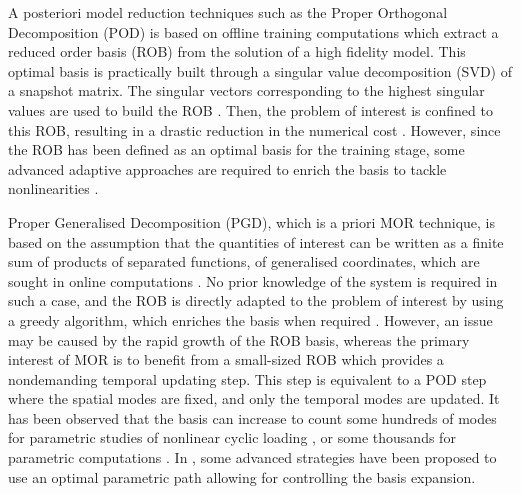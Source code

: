 A posteriori model reduction techniques such as the Proper Orthogonal Decomposition (POD) is based on offline training computations which extract a reduced order basis (ROB) from the solution of a high fidelity model. This optimal basis is practically built through a singular value decomposition (SVD) of a snapshot matrix. The singular vectors corresponding to the highest singular values are used to build the ROB \parencite{cline2006computatio}. Then, the problem of interest is confined to this ROB, resulting in a drastic reduction in the numerical cost \parencite{chinesta2014separated,chinesta_encyclo_2018}. However, since the ROB has been defined as an optimal basis for the training stage, some advanced adaptive approaches are required to enrich the basis to tackle nonlinearities \parencite{kerfriden2011bridging}.

Proper Generalised Decomposition (PGD), which is a priori MOR technique, is based on the assumption that the quantities of interest can be written as a finite sum of products of separated functions, of generalised coordinates, which are sought in online computations \parencite{ladeveze1989large,chinesta2014separated}. No prior knowledge of the system is required in such a case, and the ROB is directly adapted to the problem of interest by using a greedy algorithm, which enriches the basis when required \parencite{Ladeveze2016227,bha2017}. However, an issue may be caused by the rapid growth of the ROB basis, whereas the primary interest of MOR is to benefit from a small-sized ROB which provides a nondemanding temporal updating step. This step is equivalent to a POD step where the spatial modes are fixed, and only the temporal modes are updated. It has been observed that the basis can increase to count some hundreds of modes for parametric studies of nonlinear cyclic loading \parencite{nasri2018proper}, or some thousands for parametric computations \parencite{ElHalabi2016a}. In \parencite{Heyberger2013b}, some advanced strategies have been proposed to use an optimal parametric path allowing for controlling the basis expansion.

